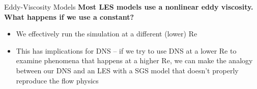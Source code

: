 \begin{frame}{Eddy-Viscosity Models}
\textbf{Most LES models use a nonlinear eddy viscosity. What happens if we use a constant?} 
\begin{itemize}
	\item We effectively run the simulation at a different (lower) Re
	\item This has implications for DNS -- if we try to use DNS at a lower Re to examine phenomena that happens at a higher Re, we can make the analogy between our DNS and an LES with a SGS model that doesn't properly reproduce the flow physics
\end{itemize}
\end{frame}





